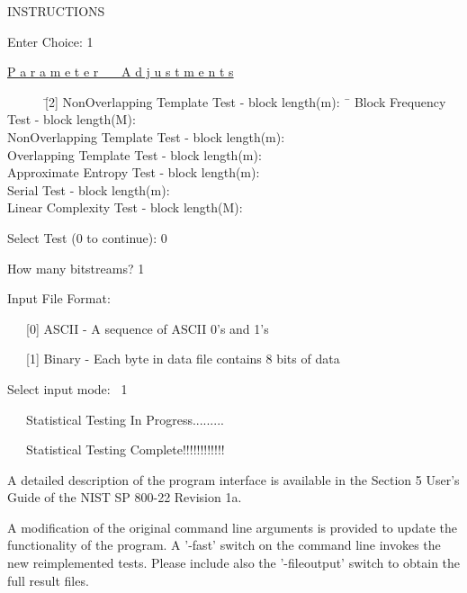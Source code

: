 \documentclass[12pt]{article}
\begin{document}
\hspace{10mm}INSTRUCTIONS

\hspace{20mm}{Enter 0 if you DO NOT want to apply all of the}\par
\hspace{20mm}{statistical tests to each sequence and 1 if you DO.}

\bigskip
Enter Choice: 1

\centerline{\underline{P a r a m e t e r \ \ \ A d j u s t m e n t s}}

\begin{tabbing}
\ \ \ \ \ \ \= [2] NonOverlapping Template Test - block length(m): \ \= \kill
    \>[1] Block Frequency Test - block length(M):          \\
    \>[2] NonOverlapping Template Test - block length(m): \\
    \>[3] Overlapping Template Test - block length(m):    \\
    \>[4] Approximate Entropy Test - block length(m):     \\
    \>[5] Serial Test - block length(m):                  \\
    \>[6] Linear Complexity Test - block length(M):       
\end{tabbing}

Select Test (0 to continue): 0

\medskip
How many bitstreams? 1

\medskip
Input File Format:

\medskip
  \ \ \  [0] ASCII - A sequence of ASCII 0's and 1's

  \ \ \  [1] Binary - Each byte in data file contains 8 bits of data

\medskip
Select input mode: \ 1

  \ \ \ Statistical Testing In Progress.........

  \ \ \ Statistical Testing Complete!!!!!!!!!!!!

\vspace{24pt}
A detailed description of the program interface is available in the Section 5 User's Guide of the NIST SP 800-22 Revision 1a.

A modification of the original command line arguments is provided to update the functionality of the program. A '-fast' switch on the command line invokes the new reimplemented tests. Please include also the '-fileoutput' switch to obtain the full result files.
\end{document}
